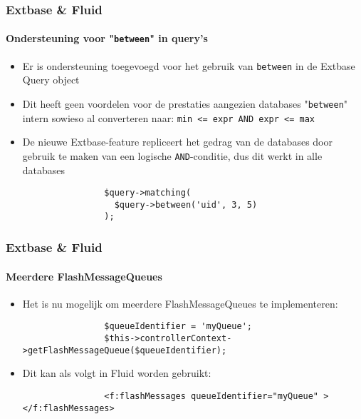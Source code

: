 \begin{frame}[fragile]
	\frametitle{Extbase \& Fluid}
	\framesubtitle{Ondersteuning voor "\texttt{between}" in query's}

	\begin{itemize}

		\item Er is ondersteuning toegevoegd voor het gebruik van \texttt{between} 
			in de Extbase Query object

		\item Dit heeft geen voordelen voor de prestaties aangezien databases
			"\texttt{between}" intern sowieso al converteren naar:\newline
			\texttt{min <= expr AND expr <= max}

		\item De nieuwe Extbase-feature repliceert het gedrag van de databases door gebruik te 
			maken van een logische \texttt{AND}-conditie, dus dit werkt in alle databases

			\begin{lstlisting}
				$query->matching(
				  $query->between('uid', 3, 5)
				);
			\end{lstlisting}

	\end{itemize}

\end{frame}


\begin{frame}[fragile]
	\frametitle{Extbase \& Fluid}
	\framesubtitle{Meerdere FlashMessageQueues}

	\begin{itemize}

		\item Het is nu mogelijk om meerdere FlashMessageQueues te implementeren:

			\begin{lstlisting}
				$queueIdentifier = 'myQueue';
				$this->controllerContext->getFlashMessageQueue($queueIdentifier);
			\end{lstlisting}

		\item Dit kan als volgt in Fluid worden gebruikt:

			\begin{lstlisting}
				<f:flashMessages queueIdentifier="myQueue" ></f:flashMessages>
			\end{lstlisting}

	\end{itemize}

\end{frame}

